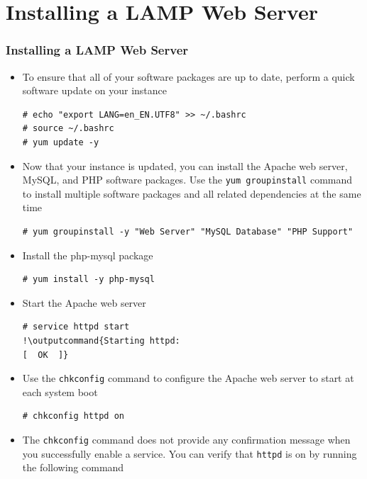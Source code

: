 \documentclass{beamer}
\newcommand{\outputcommand}[1]{\color{darkgreen}{#1}}
\begin{document}
\section{Installing a LAMP Web Server}
\begin{frame}
\frametitle{Installing a LAMP Web Server}
\begin{itemize}
\item To ensure that all of your software packages are up to date, perform a quick software update on your instance

\lstset{language=shell, escapechar=!}
\begin{lstlisting}[escapechar=!]
# echo "export LANG=en_EN.UTF8" >> ~/.bashrc
# source ~/.bashrc
# yum update -y
\end{lstlisting}
\item Now that your instance is updated, you can install the Apache web server, MySQL, and PHP software packages. Use the \texttt{yum groupinstall} command to install multiple software packages and all related dependencies at the same time
\lstset{language=shell}
\begin{lstlisting}[escapechar=!]
# yum groupinstall -y "Web Server" "MySQL Database" "PHP Support"
\end{lstlisting}
\item Install the php-mysql package
\lstset{language=shell}
\begin{lstlisting}[escapechar=!]
# yum install -y php-mysql
\end{lstlisting}

\item Start the Apache web server

\lstset{language=shell}
\begin{lstlisting}[escapechar=!]
# service httpd start
!\outputcommand{Starting httpd:                                            [  OK  ]}
\end{lstlisting}

\item Use the \texttt{chkconfig} command to configure the Apache web server to start at each system boot
\lstset{language=shell}
\begin{lstlisting}[escapechar=!]
# chkconfig httpd on
\end{lstlisting}

\item The \texttt{chkconfig} command does not provide any confirmation message when you successfully enable a service. You can verify that \texttt{httpd} is on by running the following command


\end{itemize}
\end{frame}
\end{document}
